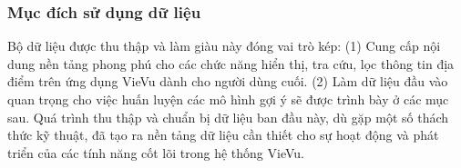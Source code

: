 \subsubsection{Mục đích sử dụng dữ liệu}
Bộ dữ liệu được thu thập và làm giàu này đóng vai trò kép: (1) Cung cấp nội dung nền tảng phong phú cho các chức năng hiển thị, tra cứu, lọc thông tin địa điểm trên ứng dụng VieVu dành cho người dùng cuối. (2) Làm dữ liệu đầu vào quan trọng cho việc huấn luyện các mô hình gợi ý sẽ được trình bày ở các mục sau.
Quá trình thu thập và chuẩn bị dữ liệu ban đầu này, dù gặp một số thách thức kỹ thuật, đã tạo ra nền tảng dữ liệu cần thiết cho sự hoạt động và phát triển của các tính năng cốt lõi trong hệ thống VieVu.
